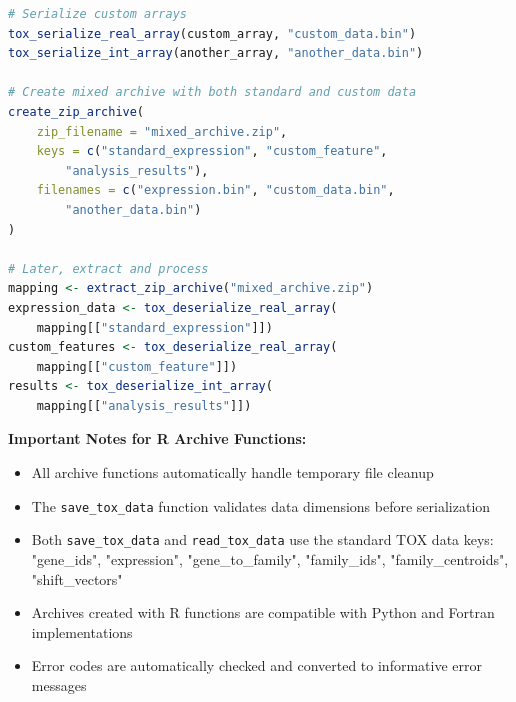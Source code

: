 \documentclass[11pt]{article}
\begin{document}
\begin{enumerate}
\begin{lstlisting}[language=R, caption={R Mixed Standard and Custom Data Archiving}]
# Serialize custom arrays
tox_serialize_real_array(custom_array, "custom_data.bin")
tox_serialize_int_array(another_array, "another_data.bin")

# Create mixed archive with both standard and custom data
create_zip_archive(
    zip_filename = "mixed_archive.zip",
    keys = c("standard_expression", "custom_feature", 
        "analysis_results"),
    filenames = c("expression.bin", "custom_data.bin", 
        "another_data.bin")
)

# Later, extract and process
mapping <- extract_zip_archive("mixed_archive.zip")
expression_data <- tox_deserialize_real_array(
    mapping[["standard_expression"]])
custom_features <- tox_deserialize_real_array(
    mapping[["custom_feature"]])
results <- tox_deserialize_int_array(
    mapping[["analysis_results"]])
\end{lstlisting}

\textbf{Important Notes for R Archive Functions:}
\begin{itemize}
	\item All archive functions automatically handle temporary file cleanup
	      
	\item The \texttt{save\_tox\_data} function validates data dimensions
	      before serialization
	      
	\item Both \texttt{save\_tox\_data} and \texttt{read\_tox\_data} use the
	      standard TOX data keys: "gene\_ids", "expression", "gene\_to\_family",
	      "family\_ids", "family\_centroids", "shift\_vectors"
	      
	\item Archives created with R functions are compatible with Python and Fortran
	      implementations
	      
	\item Error codes are automatically checked and converted to informative
	      error messages
\end{itemize}
\end{enumerate}
\end{document}
